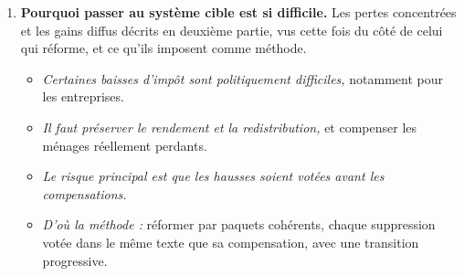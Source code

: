 \documentclass[11pt,a4paper]{article}
\newenvironment{chapitres}[1]
{\begin{enumerate}[leftmargin=1.6em,itemsep=0.15em,parsep=0pt,topsep=0.20em,start=#1]}
{\end{enumerate}}
\newenvironment{args}
{\begin{itemize}[leftmargin=1.1em,itemsep=0.1em,parsep=0pt,topsep=0.12em,label=\textbullet]}
{\end{itemize}}
\begin{document}
\begin{chapitres}{7}
\begin{args}
\end{args}
\item \textbf{Pourquoi passer au système cible est si difficile.} Les pertes concentrées et les gains
diffus décrits en deuxième partie, vus cette fois du côté de celui qui réforme, et ce qu'ils imposent
comme méthode.
\begin{args}
\item \emph{Certaines baisses d'impôt sont politiquement difficiles,} notamment pour les entreprises.
\item \emph{Il faut préserver le rendement et la redistribution,} et compenser les ménages réellement
perdants.
\item \emph{Le risque principal est que les hausses soient votées avant les compensations.}
\item \emph{D'où la méthode :} réformer par paquets cohérents, chaque suppression votée dans le même
texte que sa compensation, avec une transition progressive.
\end{args}
\end{chapitres}
\end{document}

